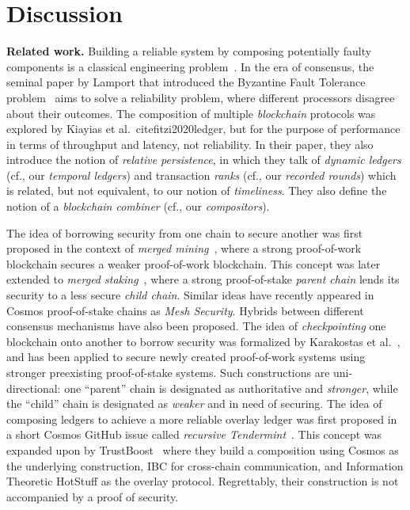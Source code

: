 \section{Discussion}

\noindent
\textbf{Related work.}
Building a reliable system by composing potentially faulty components
is a classical engineering problem~\cite{von1956probabilistic,moore1956reliable}.
In the era of consensus, the seminal
paper by Lamport that introduced the Byzantine Fault Tolerance problem~\cite{shostak1982byzantine}
aims to solve a reliability problem, where different processors disagree about their
outcomes. The composition of multiple \emph{blockchain} protocols was explored by
Kiayias et al.~cite{fitzi2020ledger}, but for the purpose of performance in terms of throughput
and latency, not reliability. In their paper, they also introduce the notion of
\emph{relative persistence}, in which they talk of \emph{dynamic ledgers} (cf., our
\emph{temporal ledgers}) and transaction \emph{ranks} (cf., our \emph{recorded rounds})
which is related, but not equivalent, to our notion of \emph{timeliness}.
They also define the notion of a \emph{blockchain combiner} (cf., our \emph{compositors}).

The idea of borrowing security from one chain to
secure another was first proposed in the context of \emph{merged mining}~\cite{namecoin}, where
a strong proof-of-work blockchain secures a weaker proof-of-work blockchain. This
concept was later extended to \emph{merged staking}~\cite{pos-sidechains}, where a
strong proof-of-stake \emph{parent chain} lends its security to a less secure
\emph{child chain}. Similar ideas have recently appeared in Cosmos proof-of-stake
chains as \emph{Mesh Security}. Hybrids between different consensus mechanisms
have also been proposed. The idea of \emph{checkpointing}
one blockchain onto another to borrow security was formalized by Karakostas et al.~\cite{karakostas2021securing},
and has been applied to secure newly created proof-of-work systems using stronger
preexisting proof-of-stake systems. Such constructions are uni-directional:
one ``parent'' chain is designated as authoritative and \emph{stronger},
while the ``child'' chain is designated as \emph{weaker} and in need of securing.
The idea of composing ledgers to achieve a more reliable overlay ledger
was first proposed in a short Cosmos GitHub issue called
\emph{recursive Tendermint}~\cite{recursive-tendermint}.
This concept was expanded upon by TrustBoost~\cite{trustboost}
where they build a composition using Cosmos as the underlying
construction, IBC for cross-chain communication, and Information Theoretic
HotStuff as the overlay protocol. Regrettably, their construction is not
accompanied by a proof of security.

